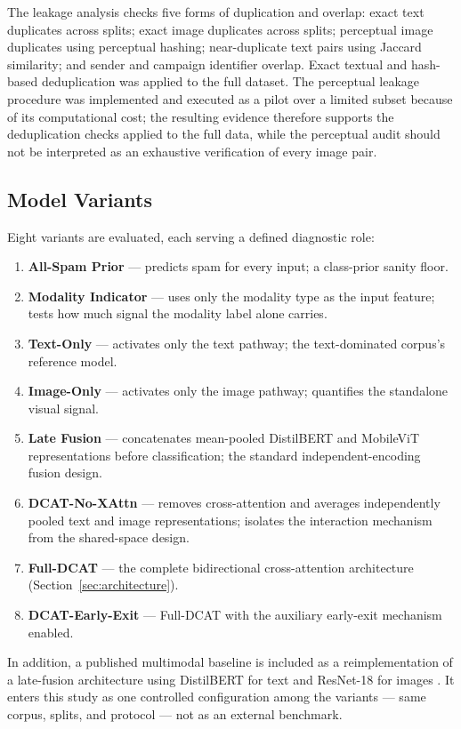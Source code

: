 \documentclass[10pt,twoside]{article}
\begin{document}
The leakage analysis checks five forms of duplication and overlap: exact text duplicates across splits; exact image duplicates across splits; perceptual image duplicates using perceptual hashing; near-duplicate text pairs using Jaccard similarity; and sender and campaign identifier overlap. Exact textual and hash-based deduplication was applied to the full dataset. The perceptual leakage procedure was implemented and executed as a pilot over a limited subset because of its computational cost; the resulting evidence therefore supports the deduplication checks applied to the full data, while the perceptual audit should not be interpreted as an exhaustive verification of every image pair.

\subsection{Model Variants}\label{sec:variants}

Eight variants are evaluated, each serving a defined diagnostic role:

\begin{enumerate}
\item \textbf{All-Spam Prior} --- predicts spam for every input; a class-prior sanity floor.
\item \textbf{Modality Indicator} --- uses only the modality type as the input feature; tests how much signal the modality label alone carries.
\item \textbf{Text-Only} --- activates only the text pathway; the text-dominated corpus's reference model.
\item \textbf{Image-Only} --- activates only the image pathway; quantifies the standalone visual signal.
\item \textbf{Late Fusion} --- concatenates mean-pooled DistilBERT and MobileViT representations before classification; the standard independent-encoding fusion design.
\item \textbf{DCAT-No-XAttn} --- removes cross-attention and averages independently pooled text and image representations; isolates the interaction mechanism from the shared-space design.
\item \textbf{Full-DCAT} --- the complete bidirectional cross-attention architecture (Section~\ref{sec:architecture}).
\item \textbf{DCAT-Early-Exit} --- Full-DCAT with the auxiliary early-exit mechanism enabled.
\end{enumerate}

In addition, a published multimodal baseline is included as a reimplementation of a late-fusion architecture using DistilBERT for text and ResNet-18 for images \citep{zhang2023mmtd}. It enters this study as one controlled configuration among the variants --- same corpus, splits, and protocol --- not as an external benchmark.
\end{document}
